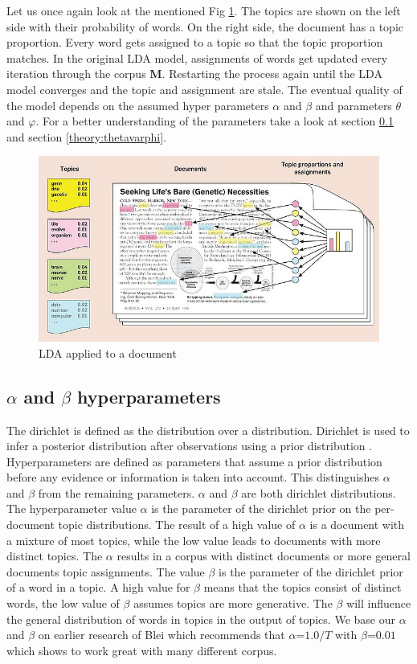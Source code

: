 Let us once again look at the mentioned Fig \ref{fig:LDA_example}. The topics are shown on the left side with their probability of words. On the right side, the document has a topic proportion. Every word gets assigned to a topic so that the topic proportion matches.  
In the original LDA model, assignments of words get updated every iteration through the corpus \textbf{M}. Restarting the process again until the LDA model converges and the topic and assignment are stale. The eventual quality of the model depends on the assumed hyper parameters $\alpha$ and $\beta$ and parameters $\theta$ and $\varphi$. For a better understanding of the parameters take a look at section \ref{theory:alphabeta} and section \ref{theory:thetavarphi}.

\begin{figure}
    \centering
    \includegraphics[scale=0.6]{methodology/700px-Illustrating_LDA.jpg}
    \caption{LDA applied to a document}
    \label{fig:LDA_example}
\end{figure}

\subsection{$\alpha$ and $\beta$ hyperparameters} \label{theory:alphabeta}
The dirichlet is defined as the distribution over a distribution. Dirichlet is used to infer a posterior distribution after observations using a prior distribution \cite{Sethuraman2001APRIORS}. Hyperparameters are defined as parameters that assume a prior distribution before any evidence or information is taken into account. This distinguishes $\alpha$ and $\beta$ from the remaining parameters. $\alpha$ and $\beta$ are both dirichlet distributions. The hyperparameter value $\alpha$ is the parameter of the dirichlet prior on the per-document topic distributions. The result of a high value of $\alpha$ is a document with a mixture of most topics, while the low value leads to documents with more distinct topics. The $\alpha$ results in a corpus with distinct documents or more general documents topic assignments. The value $\beta$ is the parameter of the dirichlet prior of a word in a topic. A high value for $\beta$ means that the topics consist of distinct words, the low value of $\beta$ assumes topics are more generative. The $\beta$ will influence the general distribution of words in topics in the output of topics. 
We base our $\alpha$ and $\beta$ on earlier research of Blei which recommends that $\alpha $=$ 1.0/T$ with $\beta $=$ 0.01$ which shows to work great with many different corpus.

